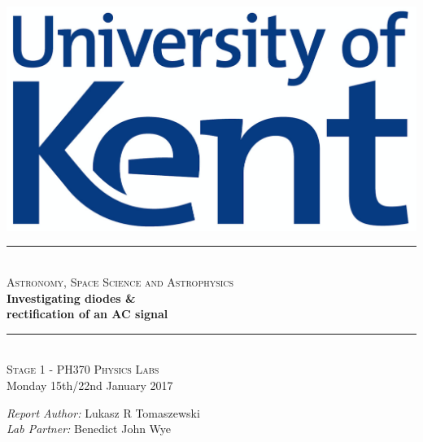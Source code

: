 \documentclass[12pt]{article}
\begin{document}
\begin{titlepage}

\newcommand{\HRule}{\rule{\linewidth}{0.5mm}}

\begin{centering} 
 

\includegraphics[scale=0.4]{Uni_of_Kent_Logo.png}\\[1cm]


\HRule \\[0.4cm]
\textsc{\large Astronomy, Space Science and Astrophysics}\\[0.4cm]
{\huge \bfseries Investigating diodes \& \\ [0.4cm] rectification of an AC signal}\\[0.4cm]
\HRule \\[1.0cm]


\textsc{\Large Stage 1 - PH370 Physics Labs}\\[0.5cm] 
{\large Monday 15th/22nd January 2017}\\[1.0cm]


\begin{minipage}{0.625\textwidth}
\centering

\emph{\large Report Author:} \large Lukasz R Tomaszewski \\ [0.2cm]
\emph{\large Lab Partner:} \large Benedict John Wye \\

\end{minipage}\\[2cm]

\vfill
\end{centering} 
\end{titlepage}
\end{document}
